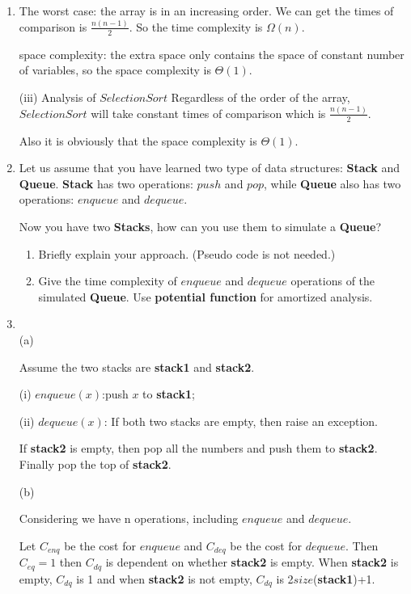 \documentclass[12pt,a4paper]{article}
\makeatletter
\newtheorem*{solution}{Solution}
\theoremstyle{definition}
\renewenvironment{solution}[1][Solution] {\par\pushQED{\qed}\normalfont\topsep6\p@\@plus6\p@\relax\trivlist\item[\hskip\labelsep\bfseries#1\@addpunct{.}]\ignorespaces}{\popQED\endtrivlist\@endpefalse} \makeatother
\makeatother
\begin{document}
\begin{enumerate}
\begin{solution}
     	The worst case: the array is in an increasing order. We can get the times of comparison is $\frac{n(n-1)}{2}$. So the time complexity is $\Omega(n)$.
     	
     	space complexity: the extra space only contains the space of constant number of variables, so the space complexity is $\Theta(1)$.
     	
     	(iii) Analysis of $SelectionSort$
     	Regardless of the order of the array, $SelectionSort$ will take constant times of comparison which is $\frac{n(n-1)}{2}$.
     	
     	Also it is obviously that the space complexity is $\Theta(1)$.
    \end{solution}

    \item
    Let us assume that you have learned two type of data structures: \textbf{Stack} and \textbf{Queue}. \textbf{Stack} has two operations: $push$ and $pop$, while \textbf{Queue} also has two operations: $enqueue$ and $dequeue$.\par
Now you have two \textbf{Stacks}, how can you use them to simulate a \textbf{Queue}?
\begin{enumerate}
\item Briefly explain your approach. (Pseudo code is not needed.)
\item Give the time complexity of $enqueue$ and $dequeue$ operations of the simulated \textbf{Queue}. Use \textbf{potential function} for amortized analysis.
\end{enumerate}
    \begin{solution}
    	~\\
       (a) 
       
       Assume the two stacks are \textbf{stack1} and \textbf{stack2}.
       
       (i) $enqueue(x)$:push $x$ to \textbf{stack1};
       
       (ii) $dequeue(x)$: If both two stacks are empty, then raise an exception.
       
       If \textbf{stack2} is empty, then pop all the numbers and push them to \textbf{stack2}. Finally pop the top of \textbf{stack2}.
       
       (b)
       
       Considering we have n operations, including $enqueue$ and $dequeue$.
       
       Let $C_{enq}$ be the cost for $enqueue$ and $C_{deq}$ be the cost for $dequeue$. Then $C_{eq}=1$ then $C_{dq}$ is dependent on whether \textbf{stack2} is empty. When \textbf{stack2} is empty, $C_{dq}$ is 1 and when \textbf{stack2} is not empty, $C_{dq}$ is 2$size$(\textbf{stack1})+1.
       

\end{solution}
\end{enumerate}
\end{document}
